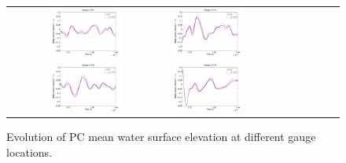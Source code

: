\begin{figure}[h]
\begin{tabular}{clc}
        
\includegraphics[width=0.475\textwidth]{./figures/musigma1.pdf} &
\includegraphics[width=0.475\textwidth]{./figures/musigma2.pdf} \\
\includegraphics[width=0.475\textwidth]{./figures/musigma3.pdf} &
\includegraphics[width=0.475\textwidth]{./figures/musigma4.pdf}
\end{tabular}
\caption{Evolution of PC mean water surface elevation at different gauge locations.}
\label{fig:ave}
\end{figure}

